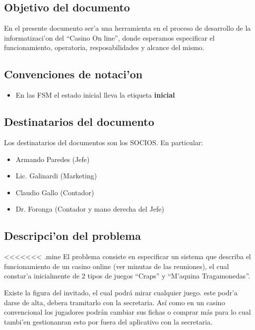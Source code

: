 \subsection{ Objetivo del documento	}

En el presente documento ser'a una herramienta en el proceso 
de desarrollo de la informatizaci'on del ``Casino On line'', donde 
esperamos especificar el funcionamiento, operatoria, resposabilidades y alcance
del mismo.


\subsection{ Convenciones de notaci'on	}
\begin{itemize}
    \item En las FSM el estado inicial lleva la etiqueta \textbf{inicial}
\end{itemize}


\subsection{ Destinatarios del documento	}
Los destinatarios del documentos son los SOCIOS. En particular:

\begin{itemize}
    \item Armando Paredes (Jefe)
    \item Lic. Galinardi (Marketing)
    \item Claudio Gallo (Contador)
    \item Dr. Foronga (Contador y mano derecha del Jefe)
\end{itemize}


\subsection{ Descripci'on del problema }

<<<<<<< .mine
El problema consiste en especificar un sistema que describa el funcionamiento
de un casino online (ver minutas de las reuniones),
el cual constar'a inicialmente de 2 tipos de juegos  ``Craps'' y ``M'aquina Tragamonedas''.

Existe la figura del invitado, el cual podrá mirar cualquier juego.
este podr'a darse de alta, debera tramitarlo con la secretaria.
Así como en un casino convencional los jugadores podrán cambiar 
sus fichas o comprar más para lo cual tambi'en gestionanran esto por fuera del aplicativo con 
la secretaria.

